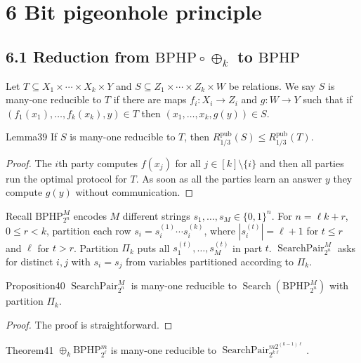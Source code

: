 \section*{6 Bit pigeonhole principle}
\subsection*{6.1 Reduction from $\mathrm{BPHP}\circ\oplus_k$ to $\mathrm{BPHP}$}
Let $T\subseteq X_1\times\cdots\times X_k\times Y$ and $S\subseteq Z_1\times\cdots\times Z_k\times W$ be relations. We say $S$ is many-one reducible to $T$ if there are maps $f_i:X_i\to Z_i$ and $g:W\to Y$ such that if $(f_1(x_1),\ldots,f_k(x_k),y)\in T$ then $(x_1,\ldots,x_k,g(y))\in S$.
\begin{authorclaim}{Lemma39}
If $S$ is many-one reducible to $T$, then $R^{\mathrm{pub}}_{1/3}(S)\le R^{\mathrm{pub}}_{1/3}(T)$.
\end{authorclaim}
\begin{proof}
The $i$th party computes $f(x_j)$ for all $j\in[k]\setminus\{i\}$ and then all parties run the optimal protocol for $T$. As soon as all the parties learn an answer $y$ they compute $g(y)$ without communication.
\end{proof}
Recall $\mathrm{BPHP}_{2^n}^M$ encodes $M$ different strings $s_1,\ldots,s_M\in\{0,1\}^n$. For $n=\ell k+r$, $0\le r<k$, partition each row $s_i=s_i^{(1)}\cdots s_i^{(k)}$, where $|s_i^{(t)}|=\ell+1$ for $t\le r$ and $\ell$ for $t>r$. Partition $\Pi_k$ puts all $s_1^{(t)},\ldots,s_M^{(t)}$ in part $t$.
$\operatorname{SearchPair}_{2^n}^M$ asks for distinct $i,j$ with $s_i=s_j$ from variables partitioned according to $\Pi_k$.
\begin{authorclaim}{Proposition40}
$\operatorname{SearchPair}_{2^n}^M$ is many-one reducible to $\operatorname{Search}(\mathrm{BPHP}_{2^n}^M)$ with partition $\Pi_k$.
\end{authorclaim}
\begin{proof}
The proof is straightforward.
\end{proof}
\begin{authorclaim}{Theorem41}
$\oplus_k\mathrm{BPHP}_{2^\ell}^m$ is many-one reducible to $\operatorname{SearchPair}_{2^{k\ell}}^{m2^{(k-1)\ell}}$.
\end{authorclaim}
